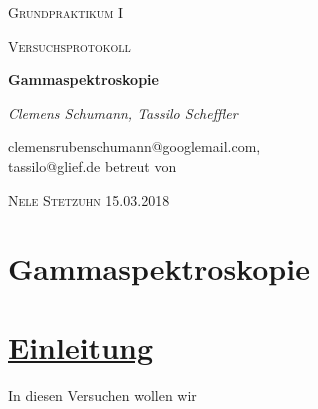 \documentclass[11pt,a4paper]{article}
\begin{document}
 
 \begin{center}
  {\scshape\LARGE Grundpraktikum I \par}
  \vspace{1cm}
  {\scshape\Large Versuchsprotokoll\par}
  \vspace{1.5cm}
  {\huge\bfseries Gammaspektroskopie\par}
  \vspace{2cm}
     {\large \itshape{Clemens Schumann, Tassilo Scheffler}\/ \par}
  \vspace{0.5cm}
  {clemensrubenschumann@googlemail.com, \\ tassilo@glief.de}
  \vfill
  betreut von\par
  \textsc{Nele Stetzuhn }
  \vfill
  {\Large 15.03.2018}
 
 \end{center}
 
 \thispagestyle{empty}
 
 \newpage
 \setcounter{page}{1}
 \tableofcontents
 \newpage
 \section*{Gammaspektroskopie}
 \section{\underline{Einleitung}}
 In diesen Versuchen wollen wir 
\end{document}

